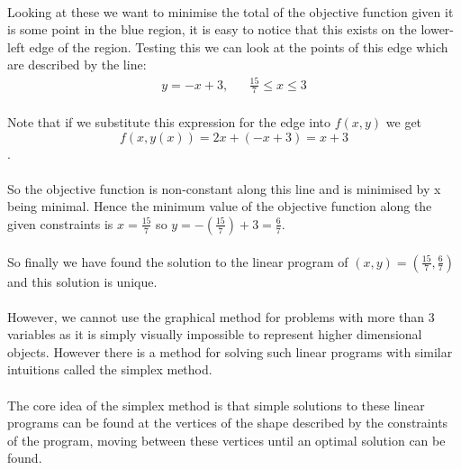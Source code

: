 \documentclass{article}
\begin{document}
\paragraph{}Looking at these we want to minimise the total of the objective function given it is some point in the blue region, it is easy to notice that this exists on the lower-left edge of the region. Testing this we can look at the points of this edge which are described by the line:
\begin{equation*}
\begin{aligned}
y=-x + 3, & & \frac{15}{7} \leq x \leq 3
\end{aligned}
\end{equation*}

\paragraph{}Note that if we substitute this expression for the edge into $f(x, y)$ we get $$f(x,y(x)) = 2x + (-x + 3) = x + 3$$.
\paragraph{}So the objective function is non-constant along this line and is minimised by x being minimal. Hence the minimum value of the objective function along the given constraints is $x=\frac{15}{7}$ so $y=-(\frac{15}{7}) + 3 = \frac{6}{7}$.
\paragraph{}So finally we have found the solution to the linear program of $(x, y) = (\frac{15}{7}, \frac{6}{7})$ and this solution is unique.

\paragraph{}However, we cannot use the graphical method for problems with more than 3 variables as it is simply visually impossible to represent higher dimensional objects. However there is a method for solving such linear programs with similar intuitions called the simplex method.

\paragraph{}The core idea of the simplex method is that simple solutions to these linear programs can be found at the vertices of the shape described by the constraints of the program, moving between these vertices until an optimal solution can be found.
\end{document}
